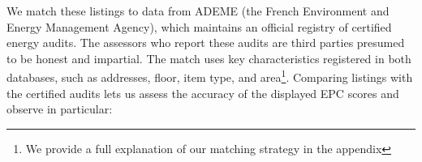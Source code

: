 We match these listings to data from ADEME (the French Environment and Energy Management Agency), which maintains an official registry of certified energy audits. The assessors who report these audits are third parties presumed to be honest and impartial. The match uses key characteristics registered in both databases, such as addresses, floor, item type, and area\footnote{We provide a full explanation of our matching strategy in the appendix}. Comparing listings with the certified audits lets us assess the accuracy of the displayed EPC scores and observe in particular:
